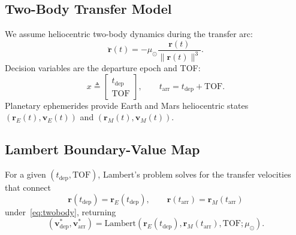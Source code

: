 \documentclass[conference]{IEEEtran}
\begin{document}
	\subsection{Two-Body Transfer Model}
	We assume heliocentric two-body dynamics during the transfer arc:
	\begin{equation}
		\ddot{\mathbf{r}}(t) = -\mu_{\odot}\frac{\mathbf{r}(t)}{\|\mathbf{r}(t)\|^3}.
		\label{eq:twobody}
	\end{equation}
	Decision variables are the departure epoch and TOF:
	\begin{equation}
		x \triangleq \begin{bmatrix} t_{\mathrm{dep}} \\ \mathrm{TOF} \end{bmatrix}, \qquad
		t_{\mathrm{arr}} = t_{\mathrm{dep}} + \mathrm{TOF}.
		\label{eq:decision}
	\end{equation}
	Planetary ephemerides provide Earth and Mars heliocentric states
	$(\mathbf{r}_E(t),\mathbf{v}_E(t))$ and $(\mathbf{r}_M(t),\mathbf{v}_M(t))$.
	
	\subsection{Lambert Boundary-Value Map}
	For a given $(t_{\mathrm{dep}}, \mathrm{TOF})$, Lambert’s problem solves for the transfer velocities that connect
	\begin{equation}
		\mathbf{r}(t_{\mathrm{dep}})=\mathbf{r}_E(t_{\mathrm{dep}}), \qquad
		\mathbf{r}(t_{\mathrm{arr}})=\mathbf{r}_M(t_{\mathrm{arr}})
		\label{eq:bc}
	\end{equation}
	under~\eqref{eq:twobody}, returning
	\begin{equation}
		(\mathbf{v}^{\ast}_{\mathrm{dep}},\mathbf{v}^{\ast}_{\mathrm{arr}})
		= \mathrm{Lambert}\!\left(\mathbf{r}_E(t_{\mathrm{dep}}),\mathbf{r}_M(t_{\mathrm{arr}}),\mathrm{TOF};\mu_{\odot}\right).
		\label{eq:lambertmap}
	\end{equation}
	
\end{document}

